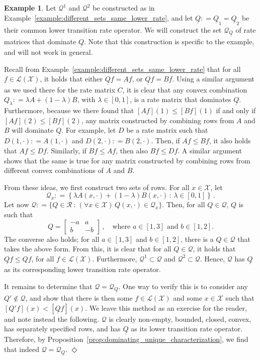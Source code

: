\documentclass[10pt]{paper}
\theoremstyle{definition}
\newtheorem{exmp}{Example}%
\newcommand{\states}{\mathcal{X}}
\newcommand{\gambles}{\mathcal{L}}
\newcommand{\gamblesX}{\gambles(\states)}
\newcommand{\rateset}{\mathcal{Q}}
\newcommand{\lrate}{\underline{Q}}
\newcommand{\coloneqq}{:\!=}
\newcommand{\exampleend}{\hfill$\Diamond$}
\begin{document}
\begin{exmp}
Let $\rateset^1$ and $\rateset^2$ be constructed as in Example~\ref{example:different_sets_same_lower_rate}, and let $\lrate\coloneqq\lrate_1=\lrate_2$ be their common lower transition rate operator. We will construct the set $\rateset_{\lrate}$ of rate matrices that dominate $\lrate$. Note that this construction is specific to the example, and will not work in general.

Recall from Example~\ref{example:different_sets_same_lower_rate} that for all $f\in\gamblesX$, it holds that either $\lrate f=Af$, or $\lrate f=Bf$. Using a similar argument as we used there for the rate matrix $C$, it is clear that any convex combination $Q_\lambda\coloneqq \lambda A+(1-\lambda)B$, with $\lambda\in[0,1]$, is a rate matrix that dominates $\lrate$. Furthermore, because we there found that $[Af](1)\leq [Bf](1)$ if and only if $[Af](2)\leq[Bf](2)$, any matrix constructed by combining rows from $A$ and $B$ will dominate $\lrate$. For example, let $D$ be a rate matrix such that $D(1,\cdot)\coloneqq A(1,\cdot)$ and $D(2,\cdot)\coloneqq B(2,\cdot)$. Then, if $Af\leq Bf$, it also holds that $Af\leq Df$. Similarly, if $Bf\leq Af$, then also $Bf\leq Df$. A similar argument shows that the same is true for any matrix constructed by combining rows from different convex combinations of $A$ and $B$.

From these ideas, we first construct two sets of rows. For all $x\in\states$, let
\begin{equation*}
\rateset_x \coloneqq \left\{\lambda A(x,\cdot)+(1-\lambda)B(x,\cdot)\,:\,\lambda\in[0,1]\right\}\,.
\end{equation*}
Let now $\rateset \coloneqq \{Q\in\mathcal{R}\,:\,(\forall x\in\states)\, Q(x,\cdot)\in\rateset_x\}$. Then, for all $Q\in\rateset$, $Q$ is such that
\begin{equation*}
Q=\left[\begin{array}{rr}-a & a \\ b& -b\end{array}\right]\,,\quad\text{where $a\in[1,3]$ and $b\in[1,2]$.}
\end{equation*}
The converse also holds; for all $a\in[1,3]$ and $b\in[1,2]$, there is a $Q\in\rateset$ that takes the above form. From this, it is clear that for all $Q\in\rateset$, it holds that $\lrate f\leq Qf$, for all $f\in\gamblesX$. Furthermore, $\rateset^1\subset\rateset$ and $\rateset^2\subset\rateset$. Hence, $\rateset$ has $\lrate$ as its corresponding lower transition rate operator. 

It remains to determine that $\rateset=\rateset_{\lrate}$. One way to verify this is to consider any $Q'\notin\rateset$, and show that there is then some $f\in\gamblesX$ and some $x\in\states$ such that $[Q'f](x)<[\lrate f](x)$. We leave this method as an exercise for the reader, and note instead the following. $\rateset$ is clearly non-empty, bounded, closed, convex, has separately specified rows, and has $\lrate$ as its lower transition rate operator. Therefore, by Proposition~\ref{prop:dominating_unique_characterization}, we find that indeed $\rateset=\rateset_{\lrate}$.
\exampleend
\end{exmp}
\end{document}
